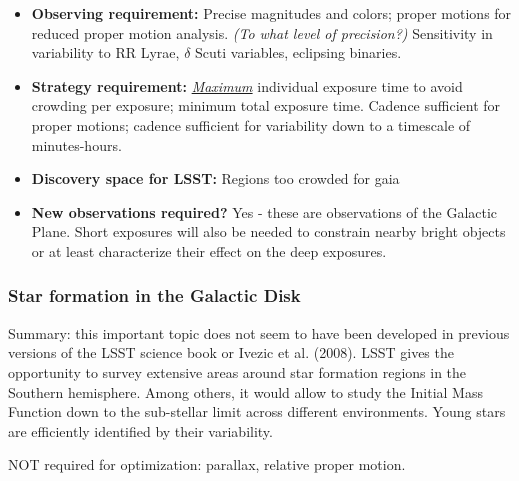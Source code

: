 \begin{itemize}
\item {\bf Observing requirement:} Precise magnitudes and colors; proper motions for reduced proper motion analysis. {\it (To what level of precision?)} Sensitivity in variability to RR Lyrae,  $\delta$ Scuti variables, eclipsing binaries.
\vspace{-2mm}

\item {\bf Strategy requirement:} \underline{\it Maximum} individual exposure time to avoid crowding per exposure; minimum total exposure time. Cadence sufficient for proper motions; cadence sufficient for variability down to a timescale of minutes-hours.
\vspace{-2mm}

\item {\bf Discovery space for LSST:} Regions too crowded for gaia
\vspace{-2mm}


\item {\bf New observations required?} Yes - these are observations of the Galactic Plane. Short exposures will also be needed to constrain nearby bright objects or at least characterize their effect on the deep exposures.
\vspace{-2mm}
\end{itemize}


\subsubsection{Star formation in the Galactic Disk}

Summary: this important topic does not seem to have been developed in
previous versions of the LSST science book or Ivezic et
al. (2008). LSST gives the opportunity to survey extensive areas
around star formation regions in the Southern hemisphere. Among
others, it would allow to study the Initial Mass Function down to the
sub-stellar limit across different environments. Young stars are
efficiently identified by their variability.

NOT required for optimization: parallax, relative proper motion.

